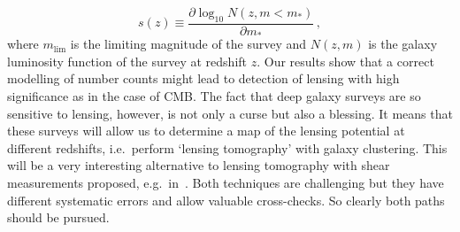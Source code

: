 \begin{equation}
s(z)  \equiv \frac{\partial\log_{10} N(z,m<m_*)}{\partial m_*}\,,
\end{equation}
where $m_{\mathrm{lim}}$ is the limiting magnitude of the survey and $N(z,m)$ is the galaxy luminosity function of the survey at redshift $z$. Our results show that a correct modelling of number counts might lead to detection of lensing with high significance as in the case of CMB. The fact that deep galaxy surveys are so sensitive to lensing, however, is not only a curse but also a blessing. It means that these surveys will allow us to determine a map of the lensing potential at different redshifts, i.e.\ perform `lensing tomography' with galaxy clustering. This will be a very interesting alternative to lensing tomography with shear measurements proposed, e.g.\
in~\cite{Heavens:2003jx}. Both techniques are challenging but they have different systematic errors and allow valuable cross-checks. So clearly both paths should be pursued.
